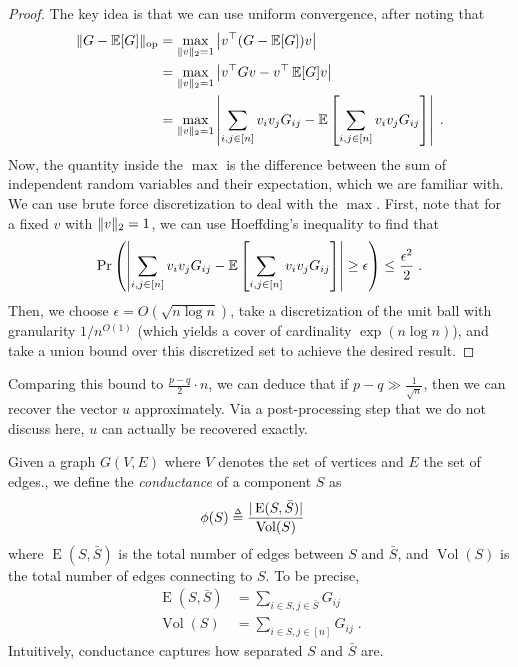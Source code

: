 \begin{proof}
The key idea is that we can use uniform convergence, after noting that
\begin{align}
    \| G - \operatorname*{\mathbb{E}}[G] \|_{\mathrm{op}} &= \max_{\| v \|_2 = 1} \left\vert v^\top (G - \operatorname*{\mathbb{E}}[G]) v \right\vert \\
    &= \max_{\| v \|_2 = 1} \left\vert v^\top G v - v^\top \operatorname*{\mathbb{E}}[G] v \right\vert \\
    &= \max_{\| v \|_2 = 1} \left\vert \sum_{i, j \in [n]} v_i v_j G_{ij} - \operatorname*{\mathbb{E}} \left[ \sum_{i, j \in [n]} v_i v_j G_{ij} \right] \right\vert \;.
\end{align}
Now, the quantity inside the $\max$ is the difference between the sum of independent random variables and their expectation, which we are familiar with. We can use brute force discretization to deal with the $\max$. First, note that for a fixed $v$ with $\| v \|_2 = 1$, we can use Hoeffding's inequality to find that
\begin{align}
    \Pr \left( \left\vert \sum_{i, j \in [n]} v_i v_j G_{ij} - \operatorname*{\mathbb{E}} \left[ \sum_{i, j \in [n]} v_i v_j G_{ij} \right] \right\vert \geq \epsilon \right) \leq \frac{\epsilon^2}{2} \;.
\end{align}
Then, we choose $\epsilon = O(\sqrt{n \log n})$, take a discretization of the unit ball with granularity $1/n^{O(1)}$ (which yields a cover of cardinality  $\exp(n \log n)$), and take a union bound over this discretized set to achieve the desired result.
\end{proof}

\begin{remark}
Comparing this bound to $\frac{p - q}{2} \cdot n$, we can deduce that if $p - q \gg \frac{1}{\sqrt{n}}$, then we can recover the vector $u$ approximately. Via a post-processing step that we do not discuss here, $u$ can actually be recovered exactly.
\end{remark}


Given a graph $G(V, E)$ where $V$ denotes the set of vertices and $E$ the set of edges., we define the {\it conductance} of a component $S$ as
\begin{align}
    \phi(S) &\defeq \frac{\vert \operatorname{E}(S, \bar{S}) \vert}{\operatorname{Vol}(S)}
\end{align}
where $\operatorname{E}(S, \bar{S})$ is the total number of edges between $S$ and $\bar{S}$, and $\operatorname{Vol}(S)$ is the total number of edges connecting to $S$. To be precise,
\begin{align}
    \operatorname{E}(S, \bar{S}) &= \sum_{i \in S, j \in \bar{S}} G_{ij} \\
    \operatorname{Vol}(S) &= \sum_{i \in S, j \in [n]} G_{ij} \;.
\end{align}
Intuitively, conductance captures how separated $S$ and $\bar{S}$ are. 


